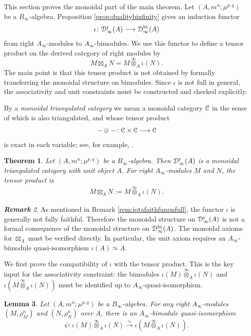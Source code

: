 \documentclass[a4paper, 11pt]{amsart}
\newtheorem{thm}{Theorem}[section]
\newtheorem{lem}[thm]{Lemma}
\theoremstyle{definition}
\theoremstyle{remark}
\newtheorem{rem}[thm]{\bf Remark}
\numberwithin{equation}{section}
\newcommand{\RR}{\mathrm{r}}
\newcommand{\BB}{\mathrm{bi}}
\newcommand{\EC}{\EuScript{C}}
\newcommand{\ED}{\EuScript{D}}
\begin{document}
This section proves the monoidal part of the main theorem. Let $(A,m^n;\mu^{p,q})$ be a $B_\infty$-algebra. Proposition \ref{prop:dualitybinfinity} gives an induction functor
\[
\iota\colon \ED^{\RR}_\infty(A)\longrightarrow \ED^{\BB}_\infty(A)
\]
from right $A_\infty$-modules to $A_\infty$-bimodules. We use this functor to define a tensor product on the derived category of right modules by
\[
M\boxtimes_A N=M\overset{\infty}{\otimes}_A\iota(N).
\]
The main point is that this tensor product is not obtained by formally transferring the monoidal structure on bimodules. Since $\iota$ is not full in general, the associativity and unit constraints must be constructed and checked explicitly.

By a {\it monoidal triangulated category} we mean a monoidal category $\EC$ in the sense of \cite[Definition 2.1.1]{EGNO} which is also triangulated, and whose tensor product
\[
-\otimes -\colon \EC\times \EC\longrightarrow \EC
\]
is exact in each variable; see, for example, \cite[Definition 2.1]{NVY02}.

\begin{thm}\label{thm:monoidalcatofrightmod}
Let $(A,m^n;\mu^{p,q})$ be a $B_\infty$-algebra. Then $\ED^{\RR}_\infty(A)$ is a monoidal triangulated category with unit object $A$. For right $A_\infty$-modules $M$ and $N$, the tensor product is
\begin{align}
M \boxtimes_A N := M\overset{\infty}{\otimes}_A \iota(N).
\end{align}
\end{thm}

\begin{rem}\label{rem:monoidalbrace}
As mentioned in Remark \ref{rem:iotafaithfunonfull}, the functor $\iota$ is generally not fully faithful. Therefore the monoidal structure on $\ED^{\RR}_\infty(A)$ is not a formal consequence of the monoidal structure on $\ED^{\BB}_\infty(A)$. The monoidal axioms for $\boxtimes_A$ must be verified directly. In particular, the unit axiom requires an $A_\infty$-bimodule quasi-isomorphism $\iota(A)\simeq A$.
\end{rem}

We first prove the compatibility of $\iota$ with the tensor product. This is the key input for the associativity constraint: the bimodules $\iota(M)\overset{\infty}{\otimes}_A \iota(N)$ and $\iota(M\overset{\infty}{\otimes}_A \iota(N))$ must be identified up to $A_{\infty}$-quasi-isomorphism.
\begin{lem}\label{lem:isomorphismmn}
Let $(A,m^n;\mu^{p,q})$ be a $B_\infty$-algebra. For any right $A_\infty$-modules $(M,\rho_M^n)$ and $(N,\rho_N^n)$ over $A$, there is an $A_\infty$-bimodule quasi-isomorphism
\[
 \psi\colon \iota(M)\overset{\infty}{\otimes}_A \iota(N)\xrightarrow{\simeq} \iota(M\overset{\infty}{\otimes}_A \iota(N)).
\]
\end{lem}
\end{document}
